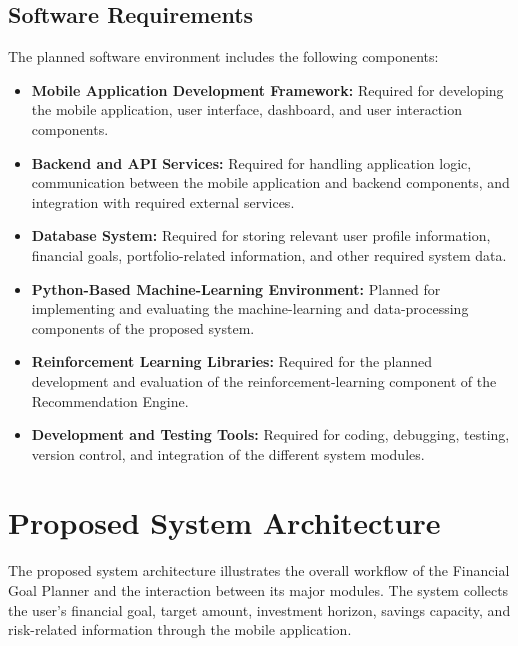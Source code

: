 \subsection{Software Requirements}

The planned software environment includes the following components:

\begin{itemize}

    \item \textbf{Mobile Application Development Framework:}
    Required for developing the mobile application, user interface,
    dashboard, and user interaction components.

    \item \textbf{Backend and API Services:}
    Required for handling application logic, communication between
    the mobile application and backend components, and integration
    with required external services.

    \item \textbf{Database System:}
    Required for storing relevant user profile information, financial
    goals, portfolio-related information, and other required system
    data.

    \item \textbf{Python-Based Machine-Learning Environment:}
    Planned for implementing and evaluating the machine-learning and
    data-processing components of the proposed system.

    \item \textbf{Reinforcement Learning Libraries:}
    Required for the planned development and evaluation of the
    reinforcement-learning component of the Recommendation Engine.

    \item \textbf{Development and Testing Tools:}
    Required for coding, debugging, testing, version control, and
    integration of the different system modules.

\end{itemize}
\section{Proposed System Architecture}
The proposed system architecture illustrates the overall workflow of the Financial Goal Planner and the interaction between its major modules. The system collects the user's financial goal, target amount, investment horizon, savings capacity, and risk-related information through the mobile application.

